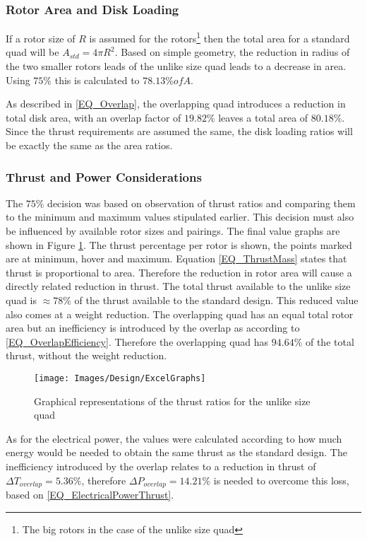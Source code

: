 	
			\subsubsection{Rotor Area and Disk Loading}
			If a rotor size of $R$ is assumed for the rotors\footnote{The big rotors in the case of the unlike size quad} then the total area for a standard quad will be $A_{std} = 4 \pi R^2$. Based on simple geometry, the reduction in radius of the two smaller rotors leads of the unlike size quad leads to a decrease in area. Using $75\%$ this is calculated to $78.13\% of A$. 
			
			As described in \eqref{EQ_Overlap}, the overlapping quad introduces a reduction in total disk area, with an overlap factor of $19.82\%$ leaves a total area of $80.18\%$. Since the thrust requirements are assumed the same, the disk loading ratios will be exactly the same as the area ratios.
			
			\subsubsection{Thrust and Power Considerations}
			The $75\%$ decision was based on observation of thrust ratios and comparing them to the minimum and maximum values stipulated earlier. This decision must also be influenced by available rotor sizes and pairings. The final value graphs are shown in Figure \ref{IM_ExcelGraphs}. The thrust percentage per rotor is shown, the points marked are at minimum, hover and maximum. Equation \eqref{EQ_ThrustMass} states that thrust is proportional to area. Therefore the reduction in rotor area will cause a directly related reduction in thrust. The total thrust available to the unlike size quad is $\approx 78\%$ of the thrust available to the standard design. This reduced value also comes at a weight reduction. The overlapping quad has an equal total rotor area but an inefficiency is introduced by the overlap as according to \eqref{EQ_OverlapEfficiency}. Therefore the overlapping quad has $94.64\%$ of the total thrust, without the weight reduction.
			
			\begin{figure}[H]
			\centering
			\texttt{[image: Images/Design/ExcelGraphs]}
			\caption{Graphical representations of the thrust ratios for the unlike size quad}
			\label{IM_ExcelGraphs}
			\end{figure}
			
			As for the electrical power, the values were calculated according to how much energy would be needed to obtain the same thrust as the standard design. The inefficiency introduced by the overlap relates to a reduction in thrust of $\Delta T_{overlap} = 5.36\%$, therefore $\Delta P_{overlap} = 14.21\%$ is needed to overcome this loss, based on \eqref{EQ_ElectricalPowerThrust}. 
			
